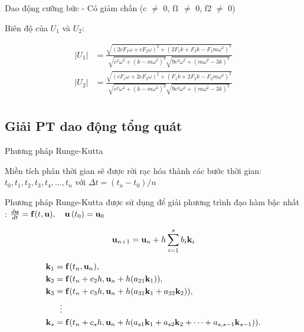 \documentclass[aspectratio=169, t]{beamer} %
\begin{document}
\begin{frame}{Dao động cưỡng bức - Có giảm chấn (c $\neq$ 0, f1 $\neq$ 0, f2 $\neq$ 0)}

\vspace{10mm}

Biên độ của $U_1$ và $U_2$:

\begin{equation}
    \begin{aligned}
         \left|U_1\right|&=\frac{\sqrt{\left(2 c F_1 \omega+c F_2 \omega\right)^2+\left(2 F_1 k+F_2 k-F_1 m \omega^2\right)^2}}{\sqrt{c^2 \omega^2+\left(k-m \omega^2\right)^2} \sqrt{9 c^2 \omega^2+\left(m \omega^2-3 k\right)^2}} \\
         \left|U_2\right|&=\frac{\sqrt{\left(c F_1 \omega+2 c F_2 \omega\right)^2+\left(F_1 k+2 F_2 k-F_2 m \omega^2\right)^2}}{\sqrt{c^2 \omega^2+\left(k-m \omega^2\right)^2} \sqrt{9 c^2 \omega^2+\left(m \omega^2-3 k\right)^2}}\\
    \end{aligned}
\end{equation}
\end{frame}

\subsection{Giải PT dao động tổng quát}

\begin{frame}{Phương pháp Runge-Kutta}

Miền tích phân thời gian sẽ được rời rạc hóa thành các bước thời gian: $t_0, t_1, t_2, t_3, t_4, \dots, t_n$ với $\Delta t = (t_n-t_0)/n$

Phương pháp Runge-Kutta được sử dụng để giải phương trình đạo hàm bậc nhất : $\frac{d {\bf u}}{d t}={\bf f}(t,{\bf u}) ,\quad {\bf u}\left(t_0\right)={\bf u}_0$

\begin{equation}
    {\bf u}_{n+1} = {\bf u}_n + h \sum_{i=1}^s b_i {\bf k}_i
\end{equation}

\begin{equation}
\begin{aligned}
     {\bf k}_1 & = {\bf f}(t_n, {\bf u}_n), \\
     {\bf k}_2 & = {\bf f}(t_n+c_2h, {\bf u}_n+h(a_{21}{\bf k}_1)), \\
     {\bf k}_3 & = {\bf f}(t_n+c_3h, {\bf u}_n+h(a_{31}{\bf k}_1+a_{32}{\bf k}_2)), \\
         & \ \ \vdots \\
     {\bf k}_s & = {\bf f}(t_n+c_sh, {\bf u}_n+h(a_{s1}{\bf k}_1+a_{s2}{\bf k}_2+\cdots+a_{s,s-1}{\bf k}_{s-1})).
\end{aligned}
\end{equation}

\end{frame}
\end{document}
